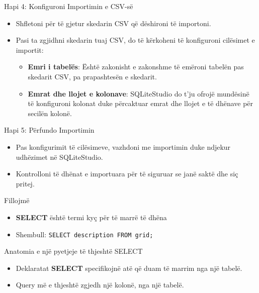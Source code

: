 \documentclass[
  ignorenonframetext,
]{beamer}
\begin{document}
\begin{frame}{Hapi 4: Konfiguroni Importimin e CSV-së}
\label{hapi-4-konfiguroni-importimin-e-csv-suxeb}
\begin{itemize}
\item
  Shfletoni për të gjetur skedarin CSV që dëshironi të importoni.
\item
  Pasi ta zgjidhni skedarin tuaj CSV, do të kërkoheni të konfiguroni
  cilësimet e importit:

  \begin{itemize}
  \item
    \textbf{Emri i tabelës}: Është zakonisht e zakonshme të emëroni
    tabelën pas skedarit CSV, pa prapashtesën e skedarit.
  \item
    \textbf{Emrat dhe llojet e kolonave}: SQLiteStudio do t'ju ofrojë
    mundësinë të konfiguroni kolonat duke përcaktuar emrat dhe llojet e
    të dhënave për secilën kolonë.
  \end{itemize}
\end{itemize}
\end{frame}

\begin{frame}{Hapi 5: Përfundo Importimin}
\label{hapi-5-puxebrfundo-importimin}
\begin{itemize}
\item
  Pas konfigurimit të cilësimeve, vazhdoni me importimin duke ndjekur
  udhëzimet në SQLiteStudio.
\item
  Kontrolloni të dhënat e importuara për të siguruar se janë saktë dhe
  siç pritej.
\end{itemize}
\end{frame}

\begin{frame}[fragile]{Fillojmë}
\label{fillojmuxeb}
\begin{itemize}
\item
  \textbf{SELECT} është termi kyç për të marrë të dhëna
\item
  Shembull: \texttt{SELECT\ description\ FROM\ grid;}
\end{itemize}
\end{frame}

\begin{frame}{Anatomia e një pyetjeje të thjeshtë SELECT}
\label{anatomia-e-njuxeb-pyetjeje-tuxeb-thjeshtuxeb-select}
\begin{itemize}
\item
  Deklaratat \textbf{SELECT} specifikojnë atë që duam të marrim nga një
  tabelë.
\item
  Query më e thjeshtë zgjedh një kolonë, nga një tabelë.
\end{itemize}
\end{frame}
\end{document}
